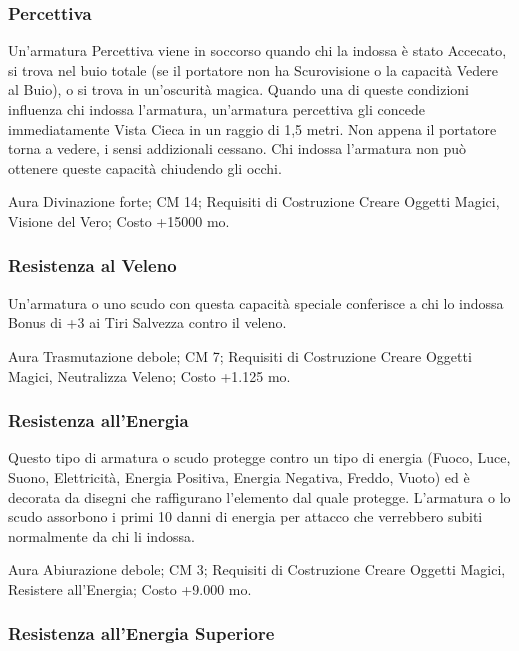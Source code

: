 \begin{multicols}{2}
\subsubsection{Percettiva}

Un'armatura Percettiva viene in soccorso quando chi la indossa è stato Accecato, si trova nel buio totale (se il portatore non ha Scurovisione o la capacità Vedere al Buio), o si trova in un'oscurità magica. Quando una di queste condizioni influenza chi indossa l'armatura, un'armatura percettiva gli concede immediatamente Vista Cieca in un raggio di 1,5 metri. Non appena il portatore torna a vedere, i sensi addizionali cessano. Chi indossa l'armatura non può ottenere queste capacità chiudendo gli occhi.

Aura Divinazione forte; CM 14; Requisiti di Costruzione Creare Oggetti Magici, Visione del Vero; Costo +15000 mo.

\subsubsection{Resistenza al Veleno}

Un'armatura o uno scudo con questa capacità speciale conferisce a chi lo indossa Bonus di +3 ai Tiri Salvezza contro il veleno.

Aura Trasmutazione debole; CM 7; Requisiti di Costruzione Creare Oggetti Magici, Neutralizza Veleno; Costo +1.125 mo.

\subsubsection{Resistenza all'Energia}

Questo tipo di armatura o scudo protegge contro un tipo di energia (Fuoco, Luce, Suono, Elettricità, Energia Positiva, Energia Negativa, Freddo, Vuoto) ed è decorata da disegni che raffigurano l'elemento dal quale protegge. L'armatura o lo scudo assorbono i primi 10 danni di energia per attacco che verrebbero subiti normalmente da chi li indossa.

Aura Abiurazione debole; CM 3; Requisiti di Costruzione Creare Oggetti Magici, Resistere all'Energia; Costo +9.000 mo.

\subsubsection{Resistenza all'Energia Superiore}


\end{multicols}
